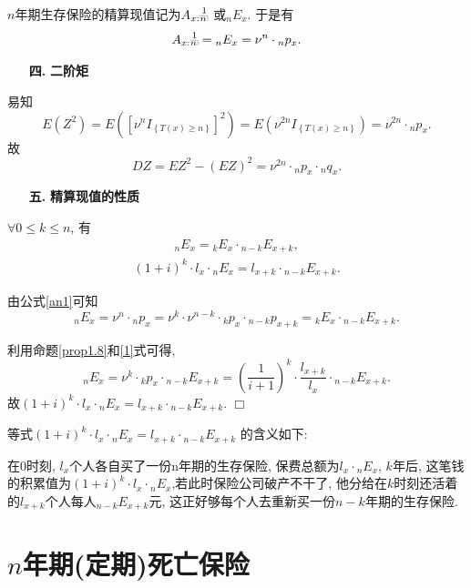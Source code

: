 \documentclass[a4paper,openany, 10pt]{ctexbook}
\makeatletter
\newcommand{\hei}{\CJKfamily{hei}}      %
\def\qed{\hfill$\Box$\medskip}
\DeclareRobustCommand{\annu}[1]{_{%
    \def\arraystretch{0}%
    \setlength\arraycolsep{1pt}%
    \setlength\arrayrulewidth{.2pt}%
    \begin{array}[b]{@{}c|}\hline
        \\[\arraycolsep]%
        \scriptstyle #1%
    \end{array}%
}}
\makeatother
\begin{document}
$n$年期生存保险的精算现值记为$A_{x:}\overset{1}{{}\annu{n}}$ 或$_nE_x.$
于是有\begin{align}\label{an1}
  A_{x:}\overset{1}{{}\annu{n}} = {}_nE_x=\nu^n\cdot{}_np_x.
\end{align}
\begin{itemize}
    \item[{\bf\hei 四.}]{\bf\hei 二阶矩}
\end{itemize}
易知
$$E\left( Z^2 \right) =E\left( \left[ \nu^nI_{\left\{ T\left( x \right) \geqslant n \right\}} \right] ^2 \right) =E\left( \nu^{2n}I_{\left\{ T\left( x \right) \geqslant n \right\}} \right) =\nu^{2n}\cdot{}_np_x.$$ 故
$$DZ=EZ^2-\left( EZ \right) ^2=\nu^{2n}\cdot{}_np_x\cdot{}_nq_x.$$
\begin{itemize}
    \item[{\bf\hei 五.}]{\bf\hei 精算现值的性质}
\end{itemize}
\begin{proposition}
    $\forall 0\leqslant k\leqslant n$, 有
    \begin{align}\label{1}
        _nE_x={}_kE_x\cdot {}_{n-k}E_{x+k},
    \end{align}
    \begin{align}\label{2}
        (1+i)^k\cdot l_x\cdot{}_nE_x=l_{x+k}\cdot {}_{n-k}E_{x+k}.
    \end{align}
\end{proposition}
\proof 由公式\eqref{an1}可知
$$_nE_x=\nu^n\cdot {}_np_x=\nu^k\cdot \nu^{n-k}\cdot {}_kp_x\cdot {}_{n-k}p_{x+k}={}_kE_x\cdot {}_{n-k}E_{x+k}.$$

利用命题\ref{prop1.8}和\eqref{1}式可得,
$$_nE_x=\nu^k\cdot {}_kp_x\cdot {}_{n-k}E_{x+k}=(\frac{1}{i+1})^k\cdot\frac{l_{x+k}}{l_x}\cdot {}_{n-k}E_{x+k}.$$
故$(1+i)^k\cdot l_x\cdot {}_nE_x=l_{x+k}\cdot {}_{n-k}E_{x+k}.$
\qed


\begin{remark}
    等式$(1+i)^k\cdot l_x\cdot {}_nE_x=l_{x+k}\cdot {}_{n-k}E_{x+k}$ 的含义如下:

    在0时刻, $l_x$个人各自买了一份n年期的生存保险, 保费总额为$l_x\cdot {}_nE_x$, $k$年后, 这笔钱的积累值为$(1+i)^k\cdot l_x\cdot {}_nE_x$,若此时保险公司破产不干了, 他分给在$k$时刻还活着的$l_{x+k}$个人每人${}_{n-k}E_{x+k}$元, 这正好够每个人去重新买一份$n-k$年期的生存保险.
\end{remark}
\section{$n$年期(定期)死亡保险}
\end{document}
